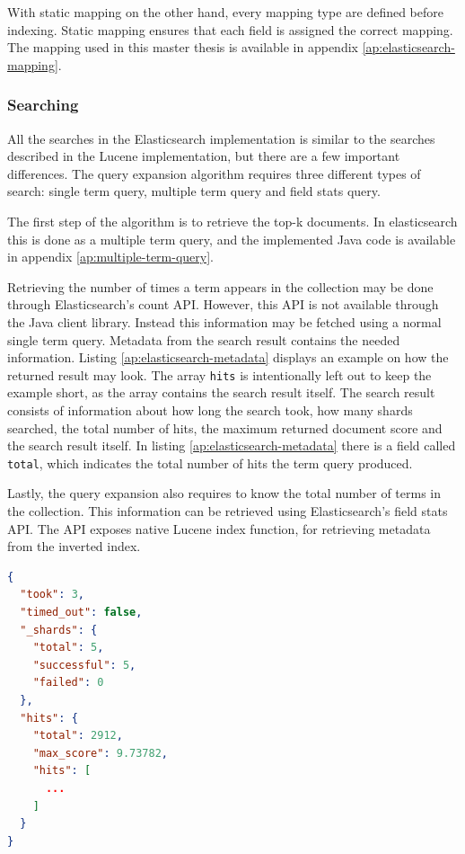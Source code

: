 With static mapping on the other hand, every mapping type are defined before indexing.
Static mapping ensures that each field is assigned the correct mapping.
The mapping used in this master thesis is available in appendix \ref{ap:elasticsearch-mapping}.

\subsubsection{Searching}
All the searches in the Elasticsearch implementation is similar to the searches described in the Lucene implementation,
but there are a few important differences.
The query expansion algorithm requires three different types of search:
single term query, multiple term query and field stats query.

The first step of the algorithm is to retrieve the top-k documents.
In elasticsearch this is done as a multiple term query,
and the implemented Java code is available in appendix \ref{ap:multiple-term-query}.

Retrieving the number of times a term appears in the collection may be done through Elasticsearch's count API.
However, this API is not available through the Java client library.
Instead this information may be fetched using a normal single term query.
Metadata from the search result contains the needed information.
Listing \ref{ap:elasticsearch-metadata} displays an example on how the returned result may look.
The array \texttt{hits} is intentionally left out to keep the example short,
as the array contains the search result itself.
The search result consists of information about how long the search took, how many shards searched, the total number of hits,
the maximum returned document score and the search result itself.
In listing \ref{ap:elasticsearch-metadata} there is a field called \texttt{total},
which indicates the total number of hits the term query produced.

Lastly, the query expansion also requires to know the total number of terms in the collection.
This information can be retrieved using Elasticsearch's field stats API.
The API exposes native Lucene index function,
for retrieving metadata from the inverted index.

\begin{lstlisting}[language={json}, caption={Example of the metadata returned by Elasticsearch.}, label={ap:elasticsearch-metadata}]
{
  "took": 3,
  "timed_out": false,
  "_shards": {
    "total": 5,
    "successful": 5,
    "failed": 0
  },
  "hits": {
    "total": 2912,
    "max_score": 9.73782,
    "hits": [
      ...
    ]
  }
}
\end{lstlisting}

